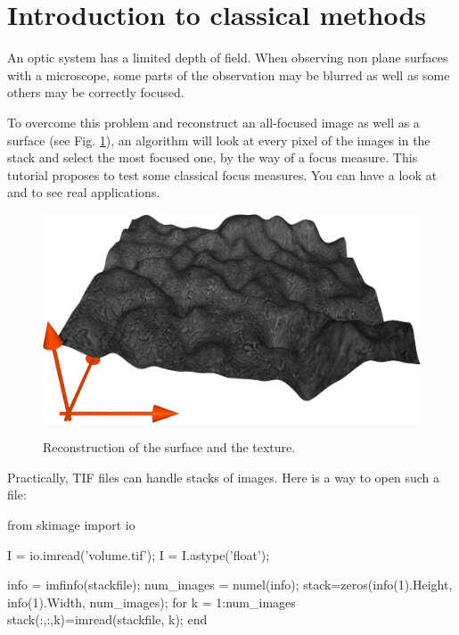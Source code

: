 \section{Introduction to classical methods}
An optic system has a limited depth of field. When observing non plane surfaces with a microscope, some parts of the observation may be blurred as well as some others may be correctly focused. 

To overcome this problem and reconstruct an all-focused image as well as a surface (see Fig. \ref{fig:surface}), an algorithm will look at every pixel of the images in the stack and select the most focused one, by the way of a focus measure. This tutorial proposes to test some classical focus measures. You can have a look at \cite{Fernandes2010} and \cite{Fernandes2012} to see real applications.

\begin{figure}[htbp]
\centering\caption{Reconstruction of the surface and the texture.}%
\vspace*{1pt}%
 \includegraphics[width=0.75\linewidth]{meshc.png}%
 \vspace*{1pt}%
 \label{fig:surface}%
\end{figure}


Practically, TIF files can handle stacks of images. Here is a way to open such a file:



\begin{python}
from skimage import io

I = io.imread('volume.tif');
I = I.astype('float');
\end{python}


\begin{matlab}
info = imfinfo(stackfile);
num_images = numel(info);
stack=zeros(info(1).Height, info(1).Width, num_images);
for k = 1:num_images
    stack(:,:,k)=imread(stackfile, k);
end
\end{matlab}

